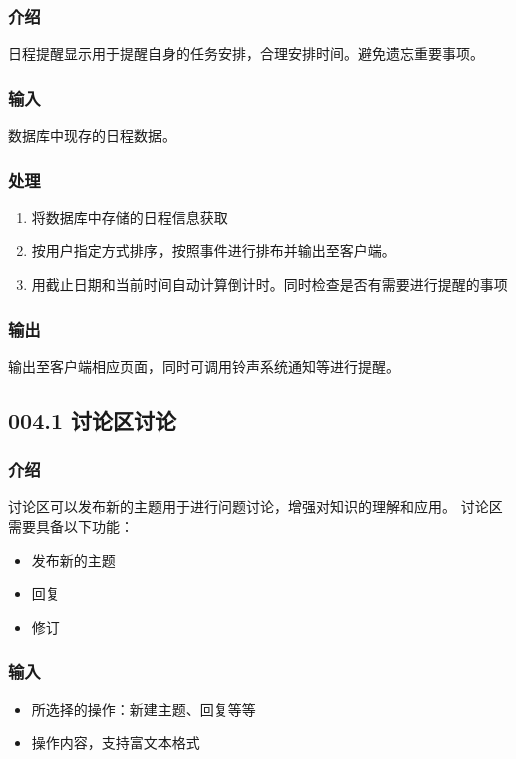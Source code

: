     \subsubsection{介绍}
    日程提醒显示用于提醒自身的任务安排，合理安排时间。避免遗忘重要事项。
    \subsubsection{输入}
    数据库中现存的日程数据。
    \subsubsection{处理}
    \begin{enumerate}
      \item 将数据库中存储的日程信息获取
      \item 按用户指定方式排序，按照事件进行排布并输出至客户端。
      \item 用截止日期和当前时间自动计算倒计时。同时检查是否有需要进行提醒的事项
    \end{enumerate}
    \subsubsection{输出}
    输出至客户端相应页面，同时可调用铃声系统通知等进行提醒。

  \subsection{004.1 讨论区讨论}
    \subsubsection{介绍}
    讨论区可以发布新的主题用于进行问题讨论，增强对知识的理解和应用。
    讨论区需要具备以下功能：
    \begin{itemize}
      \item 发布新的主题
      \item 回复
      \item 修订
    \end{itemize}
    \subsubsection{输入}
    \begin{itemize}
      \item 所选择的操作：新建主题、回复等等
      \item 操作内容，支持富文本格式
    \end{itemize}
